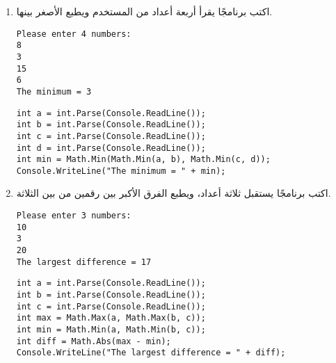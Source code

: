 \documentclass[12pt]{article}
\begin{document}
\begin{enumerate}[itemsep=3em]
    \item
    اكتب برنامجًا يقرأ أربعة أعداد من المستخدم ويطبع الأصغر بينها.
    \ifdetailed
    \begin{example}
    \begin{english}
    \begin{lstlisting}
Please enter 4 numbers:
8
3
15
6
The minimum = 3
    \end{lstlisting}
    \end{english}
    \end{example}
    \ifwithsols
    \begin{solution}
    \begin{english}
    \begin{lstlisting}
int a = int.Parse(Console.ReadLine());
int b = int.Parse(Console.ReadLine());
int c = int.Parse(Console.ReadLine());
int d = int.Parse(Console.ReadLine());
int min = Math.Min(Math.Min(a, b), Math.Min(c, d));
Console.WriteLine("The minimum = " + min);
    \end{lstlisting}
    \end{english}
    \end{solution}
    \clearpage
    \fi
\fi

    \item
    اكتب برنامجًا يستقبل ثلاثة أعداد، ويطبع الفرق الأكبر بين رقمين من بين الثلاثة.
    \ifdetailed
    \begin{example}
    \begin{english}
    \begin{lstlisting}
Please enter 3 numbers:
10
3
20
The largest difference = 17
    \end{lstlisting}
    \end{english}
    \end{example}
    \ifwithsols
    \begin{solution}
    \begin{english}
    \begin{lstlisting}
int a = int.Parse(Console.ReadLine());
int b = int.Parse(Console.ReadLine());
int c = int.Parse(Console.ReadLine());
int max = Math.Max(a, Math.Max(b, c));
int min = Math.Min(a, Math.Min(b, c));
int diff = Math.Abs(max - min);
Console.WriteLine("The largest difference = " + diff);
    \end{lstlisting}
    \end{english}
    \end{solution}
    \fi
\fi


\end{enumerate}
\end{document}

